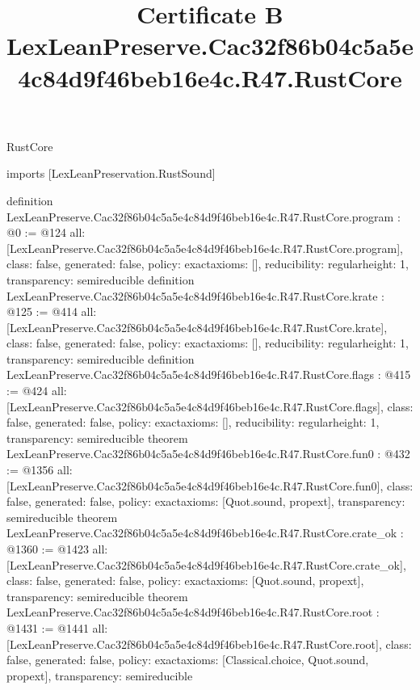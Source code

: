 \begin{lexlean}{RustCore}
\title{Certificate B LexLeanPreserve.Cac32f86b04c5a5e4c84d9f46beb16e4c.R47.RustCore}
\begin{coremodule}
imports [LexLeanPreservation.RustSound]

definition LexLeanPreserve.Cac32f86b04c5a5e4c84d9f46beb16e4c.R47.RustCore.program : @0 := @124 {
  all: [LexLeanPreserve.Cac32f86b04c5a5e4c84d9f46beb16e4c.R47.RustCore.program],
  class: false,
  generated: false,
  policy: exact{axioms: []},
  reducibility: regular{height: 1},
  transparency: semireducible
}
definition LexLeanPreserve.Cac32f86b04c5a5e4c84d9f46beb16e4c.R47.RustCore.krate : @125 := @414 {
  all: [LexLeanPreserve.Cac32f86b04c5a5e4c84d9f46beb16e4c.R47.RustCore.krate],
  class: false,
  generated: false,
  policy: exact{axioms: []},
  reducibility: regular{height: 1},
  transparency: semireducible
}
definition LexLeanPreserve.Cac32f86b04c5a5e4c84d9f46beb16e4c.R47.RustCore.flags : @415 := @424 {
  all: [LexLeanPreserve.Cac32f86b04c5a5e4c84d9f46beb16e4c.R47.RustCore.flags],
  class: false,
  generated: false,
  policy: exact{axioms: []},
  reducibility: regular{height: 1},
  transparency: semireducible
}
theorem LexLeanPreserve.Cac32f86b04c5a5e4c84d9f46beb16e4c.R47.RustCore.fun0 : @432 := @1356 {
  all: [LexLeanPreserve.Cac32f86b04c5a5e4c84d9f46beb16e4c.R47.RustCore.fun0],
  class: false,
  generated: false,
  policy: exact{axioms: [Quot.sound, propext]},
  transparency: semireducible
}
theorem LexLeanPreserve.Cac32f86b04c5a5e4c84d9f46beb16e4c.R47.RustCore.crate_ok : @1360 := @1423 {
  all: [LexLeanPreserve.Cac32f86b04c5a5e4c84d9f46beb16e4c.R47.RustCore.crate_ok],
  class: false,
  generated: false,
  policy: exact{axioms: [Quot.sound, propext]},
  transparency: semireducible
}
theorem LexLeanPreserve.Cac32f86b04c5a5e4c84d9f46beb16e4c.R47.RustCore.root : @1431 := @1441 {
  all: [LexLeanPreserve.Cac32f86b04c5a5e4c84d9f46beb16e4c.R47.RustCore.root],
  class: false,
  generated: false,
  policy: exact{axioms: [Classical.choice, Quot.sound, propext]},
  transparency: semireducible
}


\end{coremodule}
\end{lexlean}
